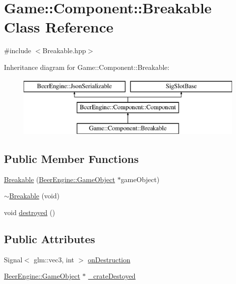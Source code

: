 \hypertarget{class_game_1_1_component_1_1_breakable}{}\section{Game\+:\+:Component\+:\+:Breakable Class Reference}
\label{class_game_1_1_component_1_1_breakable}


{\ttfamily \#include $<$Breakable.\+hpp$>$}

Inheritance diagram for Game\+:\+:Component\+:\+:Breakable\+:\begin{figure}[H]
\begin{center}
\leavevmode
\includegraphics[height=3.000000cm]{class_game_1_1_component_1_1_breakable}
\end{center}
\end{figure}
\subsection*{Public Member Functions}
\begin{DoxyCompactItemize}
\item 
\mbox{\hyperlink{class_game_1_1_component_1_1_breakable_ad739d120313be059576347fd7c691173}{Breakable}} (\mbox{\hyperlink{class_beer_engine_1_1_game_object}{Beer\+Engine\+::\+Game\+Object}} $\ast$game\+Object)
\item 
\mbox{\hyperlink{class_game_1_1_component_1_1_breakable_a865e322dd9c71227b699f85bd492b481}{$\sim$\+Breakable}} (void)
\item 
void \mbox{\hyperlink{class_game_1_1_component_1_1_breakable_a2b58c2c6c0132f8defc9b1e80220530b}{destroyed}} ()
\end{DoxyCompactItemize}
\subsection*{Public Attributes}
\begin{DoxyCompactItemize}
\item 
Signal$<$ glm\+::vec3, int $>$ \mbox{\hyperlink{class_game_1_1_component_1_1_breakable_ac0ae61567c2ac3615929e42bdb0ed735}{on\+Destruction}}
\item 
\mbox{\hyperlink{class_beer_engine_1_1_game_object}{Beer\+Engine\+::\+Game\+Object}} $\ast$ \mbox{\hyperlink{class_game_1_1_component_1_1_breakable_a1bead819f5f60d1bf354b80cf899853f}{\+\_\+crate\+Destoyed}}
\end{DoxyCompactItemize}
